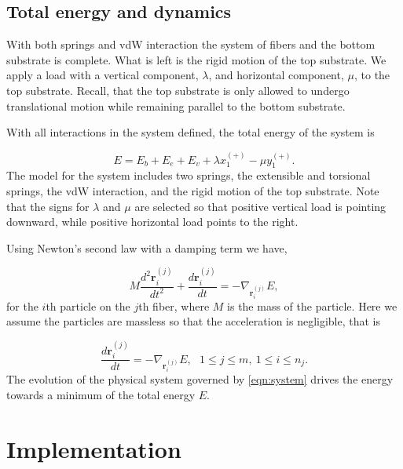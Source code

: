 
\subsection{Total energy and dynamics}

With both springs and vdW interaction the system of fibers and the bottom substrate is complete. What is left is the rigid motion of the top substrate. We apply a load with a vertical component, $\lambda$, and horizontal component, $\mu$, to the top substrate. Recall, that the top substrate is only allowed to undergo translational motion while remaining parallel to the bottom substrate.

With all interactions in the system defined, the total energy of the system is

\begin{equation}
	E = E_b + E_e + E_v + \lambda x_1^{(+)} - \mu y_1^{(+)}.
\end{equation}
The model for the system includes two springs, the extensible and torsional springs, the vdW interaction, and the rigid motion of the top substrate. Note that the signs for $\lambda$ and $\mu$ are selected so that positive vertical load is pointing downward, while positive horizontal load points to the right.

Using Newton's second law with a damping term we have,

\begin{equation}
	M\frac{d^2\textbf{r}_i^{(j)}}{dt^2} + \frac{d\textbf{r}_i^{(j)}}{dt} = -\nabla_{\textbf{r}_i^{(j)}}E,
\end{equation}
for the $i$th particle on the $j$th fiber, where $M$ is the mass of the particle. Here we assume the particles are massless so that the acceleration is negligible, that is

\begin{equation} \label{eqn:system}
	 \frac{d\textbf{r}_i^{(j)}}{dt} = -\nabla_{\textbf{r}_i^{(j)}}E,\ \ \ 1 \leq j \leq m,\  1 \leq i \leq n_j.
\end{equation}
The evolution of the physical system governed by \eqref{eqn:system} drives the energy towards a minimum of the total energy $E$.

\section{Implementation}

